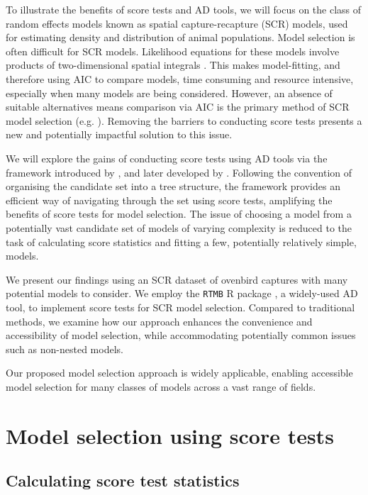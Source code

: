 \documentclass{article}
\begin{document}
To illustrate the benefits of score tests 
and AD tools, we will focus on the class of random effects models known as
spatial capture-recapture (SCR) models, used for estimating density
and distribution of animal populations. Model selection is often difficult 
for SCR models. Likelihood equations for these models involve products of two-dimensional spatial
integrals \parencite{borchersEfford2008}. This makes model-fitting, and therefore
using AIC to compare models, time consuming and resource intensive,
especially when many models are being considered. However, an absence
of suitable alternatives means comparison via AIC is the
primary method of SCR model selection
(e.g. \cite{secr-aic-ex}). Removing the barriers to conducting score
tests  presents a new and potentially impactful solution to this issue. 

We will explore the gains of conducting score tests using AD tools
via the framework introduced by \textcite{catchpoleMorgan1996}, and
later developed by \textcite{mccreaMorgan2011}. Following the
convention of organising the
candidate set into a tree structure, the framework provides an efficient way of
navigating through the set using score tests, 
amplifying the benefits of score tests for model selection. The issue
of choosing a model from a   
potentially vast candidate set of models of varying complexity is reduced to the
task of calculating score statistics and fitting a few, potentially
relatively simple, models. 

We present our findings using an SCR
dataset of ovenbird captures \parencite{secr-pkg} with many potential
models to consider. We employ
the \lstinline{RTMB} R package \parencite{rtmb-pkg}, a widely-used AD tool, to
implement score tests for SCR model selection. Compared to traditional
methods, we examine how our approach enhances the 
convenience and accessibility of model selection, while accommodating
potentially common issues such as non-nested models.

Our proposed model selection approach is widely applicable, enabling
accessible model selection for many classes of models across a vast
range of fields.  

\section{Model selection using score tests}
\label{sec:model-sel}

\subsection{Calculating score test statistics}
\label{sec:calculating-score-stat}
\end{document}
